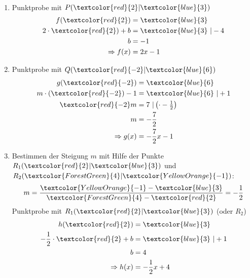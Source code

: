 \begin{Answer}[ref=punktprobeA2]\vspace{-\baselineskip}\\
	\begin{minipage}[t]{0.5\textwidth}
		\begin{enumerate}[label=\alph*)]
			\item Punktprobe mit $P(\textcolor{red}{2}|\textcolor{blue}{3})$
			\begin{align*}
				f(\textcolor{red}{2})&=\textcolor{blue}{3}\\
				2\cdot\textcolor{red}{2})+b&=\textcolor{blue}{3}\ \rvert-4\\
				b&=-1\\
				\Rightarrow f(x)&=2x-1
			\end{align*}
			\item Punktprobe mit $Q(\textcolor{red}{-2}|\textcolor{blue}{6})$
			\begin{align*}
				g(\textcolor{red}{-2})&=\textcolor{blue}{6}\\
				m\cdot\left(\textcolor{red}{-2}\right)-1&=\textcolor{blue}{6}\ \rvert+1\\
				\textcolor{red}{-2}m&=7\ \rvert\left(\cdot -\tfrac{1}{2}\right)\\
				m&=-\dfrac{7}{2}\\
				\Rightarrow g(x)&=-\dfrac{7}{2}x-1
			\end{align*}
		\end{enumerate}
	\end{minipage}
	\begin{minipage}[t]{0.5\textwidth}
		\begin{enumerate}[label=\alph*)]
			\setcounter{enumi}{2}
			\item Bestimmen der Steigung $m$ mit Hilfe der Punkte $R_1(\textcolor{red}{2}|\textcolor{blue}{3})$ und $R_2(\textcolor{ForestGreen}{4}|\textcolor{YellowOrange}{-1})$:
			\begin{align*}
				m=\dfrac{\textcolor{YellowOrange}{-1}-\textcolor{blue}{3}}{\textcolor{ForestGreen}{4}-\textcolor{red}{2}}=-\dfrac{1}{2}
			\end{align*}
			Punktprobe mit $R_1(\textcolor{red}{2}|\textcolor{blue}{3})$ (oder $R_2$)
			\begin{align*}
				h(\textcolor{red}{2})&=\textcolor{blue}{3}\\
				-\dfrac{1}{2}\cdot\textcolor{red}{2}+b&=\textcolor{blue}{3}\ \rvert +1\\
				b&=4\\
				\Rightarrow h(x)&=-\dfrac{1}{2}x+4

\end{align*}
\end{enumerate}
\end{minipage}
\end{Answer}
